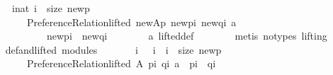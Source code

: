\begin{isabellebody}
\ \ \ \ \ \ \ {\isacharparenleft}{\kern0pt}{\isasymexists}i{\isacharcolon}{\kern0pt}{\isacharcolon}{\kern0pt}nat{\isachardot}{\kern0pt}\ i\ {\isacharless}{\kern0pt}\ size\ {\isacharquery}{\kern0pt}new{\isacharunderscore}{\kern0pt}p\ {\isasymand}\isanewline
\ \ \ \ \ \ \ \ \ \ {\isasymnot}Preference{\isacharunderscore}{\kern0pt}Relation{\isachardot}{\kern0pt}lifted\ {\isacharquery}{\kern0pt}new{\isacharunderscore}{\kern0pt}Ap\ {\isacharparenleft}{\kern0pt}{\isacharquery}{\kern0pt}new{\isacharunderscore}{\kern0pt}p{\isacharbang}{\kern0pt}i{\isacharparenright}{\kern0pt}\ {\isacharparenleft}{\kern0pt}{\isacharquery}{\kern0pt}new{\isacharunderscore}{\kern0pt}q{\isacharbang}{\kern0pt}i{\isacharparenright}{\kern0pt}\ a\ {\isasymand}\isanewline
\ \ \ \ \ \ \ \ \ \ \ \ \ \ {\isacharparenleft}{\kern0pt}{\isacharquery}{\kern0pt}new{\isacharunderscore}{\kern0pt}p{\isacharbang}{\kern0pt}i{\isacharparenright}{\kern0pt}\ {\isasymnoteq}\ {\isacharparenleft}{\kern0pt}{\isacharquery}{\kern0pt}new{\isacharunderscore}{\kern0pt}q{\isacharbang}{\kern0pt}i{\isacharparenright}{\kern0pt}{\isacharparenright}{\kern0pt}{\isachardoublequoteclose}\isanewline
\ \ \ \ \ \ \isamarkupfalse%
\ a{}\ lifted{\isacharunderscore}{\kern0pt}def\isanewline
\ \ \ \ \ \ \isamarkupfalse%
\ {\isacharparenleft}{\kern0pt}metis\ {\isacharparenleft}{\kern0pt}no{\isacharunderscore}{\kern0pt}types{\isacharcomma}{\kern0pt}\ lifting{\isacharparenright}{\kern0pt}{\isacharparenright}{\kern0pt}\isanewline
\ \ \ \ \isamarkupfalse%
\ def{\isacharunderscore}{\kern0pt}and{\isacharunderscore}{\kern0pt}lifted\ modules\ \isamarkupfalse%
\isanewline
\ \ \ \ \ \ {\isachardoublequoteopen}{\isasymforall}i{\isachardot}{\kern0pt}\ {\isacharparenleft}{\kern0pt}{}\ {\isasymle}\ i\ {\isasymand}\ i\ {\isacharless}{\kern0pt}\ size\ {\isacharquery}{\kern0pt}new{\isacharunderscore}{\kern0pt}p{\isacharparenright}{\kern0pt}\ {\isasymlongrightarrow}\isanewline
\ \ \ \ \ \ \ \ \ \ {\isacharparenleft}{\kern0pt}Preference{\isacharunderscore}{\kern0pt}Relation{\isachardot}{\kern0pt}lifted\ A\ {\isacharparenleft}{\kern0pt}p{\isacharbang}{\kern0pt}i{\isacharparenright}{\kern0pt}\ {\isacharparenleft}{\kern0pt}q{\isacharbang}{\kern0pt}i{\isacharparenright}{\kern0pt}\ a\ {\isasymor}\ {\isacharparenleft}{\kern0pt}p{\isacharbang}{\kern0pt}i{\isacharparenright}{\kern0pt}\ {\isacharequal}{\kern0pt}\ {\isacharparenleft}{\kern0pt}q{\isacharbang}{\kern0pt}i{\isacharparenright}{\kern0pt}{\isacharparenright}{\kern0pt}{\isachardoublequoteclose}\isanewline
\ \ \ \ \ \ \isamarkupfalse%

\end{isabellebody}
